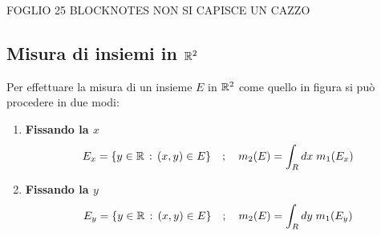 FOGLIO 25 BLOCKNOTES NON SI CAPISCE UN CAZZO

\newpage

\subsection{Misura di insiemi in $\mathbb{R}^2$}

Per effettuare la misura di un insieme $E$ in $\mathbb{R}^2$ come quello in figura si può procedere in due modi:

\begin{figure}[!htb]
\end{figure}

\begin{enumerate}
	\item \textbf{Fissando la $x$}
	\begin{align}
		E_x = \{y \in \mathbb{R} \, : \, (x,y)\in E \} \quad ; \quad 		m_2(E)= \int_{R}dx \; m_1(E_x) 
	\end{align}
	\item \textbf{Fissando la $y$}
	\begin{align}
		E_y = \{y \in \mathbb{R} \, : \, (x,y)\in E \} \quad ; \quad m_2(E)= \int_{R}dy \; m_1(E_y) 
	\end{align}
\end{enumerate}

